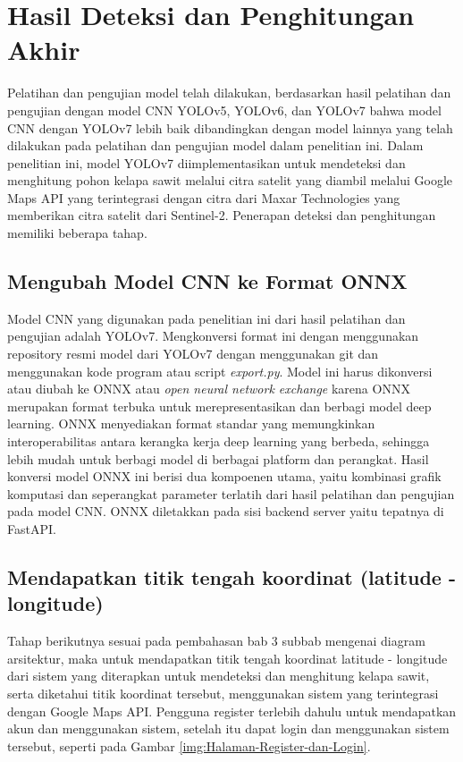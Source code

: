 \section{Hasil Deteksi dan Penghitungan Akhir}
\hspace{1,2cm}
Pelatihan dan pengujian model telah dilakukan, berdasarkan hasil pelatihan dan pengujian dengan model CNN YOLOv5, YOLOv6, dan YOLOv7 bahwa model CNN dengan YOLOv7 lebih baik dibandingkan dengan model lainnya yang telah dilakukan pada pelatihan dan pengujian model dalam penelitian ini. Dalam penelitian ini, model YOLOv7 diimplementasikan untuk mendeteksi dan menghitung pohon kelapa sawit melalui citra satelit yang diambil melalui Google Maps API yang terintegrasi dengan citra dari Maxar Technologies yang memberikan citra satelit dari Sentinel-2. Penerapan deteksi dan penghitungan memiliki beberapa tahap.

\subsection{Mengubah Model CNN ke Format ONNX}
\hspace{1,2cm}
Model CNN yang digunakan pada penelitian ini dari hasil pelatihan dan pengujian adalah YOLOv7. Mengkonversi format ini dengan menggunakan repository resmi model dari YOLOv7 dengan menggunakan git dan menggunakan kode program atau script \textit{export.py}. Model ini harus dikonversi atau diubah ke ONNX atau \textit{open neural network exchange} karena ONNX merupakan format terbuka untuk merepresentasikan dan berbagi model deep learning. ONNX menyediakan format standar yang memungkinkan interoperabilitas antara kerangka kerja deep learning yang berbeda, sehingga lebih mudah untuk berbagi model di berbagai platform dan perangkat. Hasil konversi model ONNX ini berisi dua kompoenen utama, yaitu kombinasi grafik komputasi dan seperangkat parameter terlatih dari hasil pelatihan dan pengujian pada model CNN. ONNX diletakkan pada sisi backend server yaitu tepatnya di FastAPI. 

\subsection{Mendapatkan titik tengah koordinat (latitude - longitude)}
\hspace{1,2cm}
Tahap berikutnya sesuai pada pembahasan bab 3 subbab mengenai diagram arsitektur, maka untuk mendapatkan titik tengah koordinat latitude - longitude dari sistem yang diterapkan untuk mendeteksi dan menghitung kelapa sawit, serta diketahui titik koordinat tersebut, menggunakan sistem yang terintegrasi dengan Google Maps API. Pengguna register terlebih dahulu untuk mendapatkan akun dan menggunakan sistem, setelah itu dapat login dan menggunakan sistem tersebut, seperti pada Gambar \ref{img:Halaman-Register-dan-Login}.


